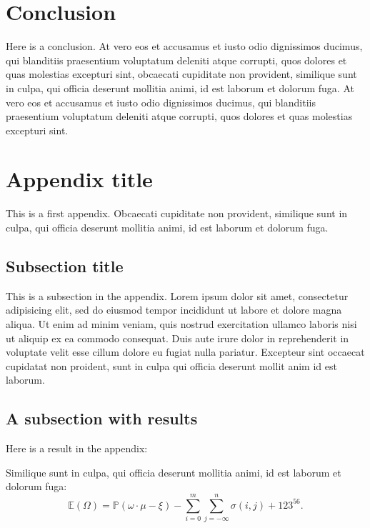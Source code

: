 \documentclass[letterpaper,12pt,leqno]{article}
\newcommand{\bib}{bibliography.bib}
\begin{document}
\section{Conclusion}\label{s:ccl}

Here is a conclusion. At vero eos et accusamus et iusto odio dignissimos ducimus, qui blanditiis praesentium voluptatum deleniti atque corrupti, quos dolores et quas molestias excepturi sint, obcaecati cupiditate non provident, similique sunt in culpa, qui officia deserunt mollitia animi, id est laborum et dolorum fuga. At vero eos et accusamus et iusto odio dignissimos ducimus, qui blanditiis praesentium voluptatum deleniti atque corrupti, quos dolores et quas molestias excepturi sint.



\newpage
\appendix
\section{Appendix title}\label{a:appendix1}

This is a first appendix. Obcaecati cupiditate non provident, similique sunt in culpa, qui officia deserunt mollitia animi, id est laborum et dolorum fuga. 

\subsection{Subsection title} 

This is a subsection in the appendix. Lorem ipsum dolor sit amet, consectetur adipisicing elit, sed do eiusmod tempor incididunt ut labore et dolore magna aliqua. Ut enim ad minim veniam, quis nostrud exercitation ullamco laboris nisi ut aliquip ex ea commodo
consequat. Duis aute irure dolor in reprehenderit in voluptate velit esse
cillum dolore eu fugiat nulla pariatur. Excepteur sint occaecat cupidatat non
proident, sunt in culpa qui officia deserunt mollit anim id est laborum. 

\subsection{A subsection with results}

Here is a result in the appendix:

\begin{corollary} Similique sunt in culpa, qui officia deserunt mollitia animi, id est laborum et dolorum fuga:
\begin{equation*}
\mathbb{E}(\Omega) = \mathbb{P}(\omega\cdot \mu - \xi) - \sum_{i=0}^{m}\sum_{j=-\infty}^{n} \sigma(i,j) + 123^{56}.
\end{equation*}\end{corollary}
\end{document}
